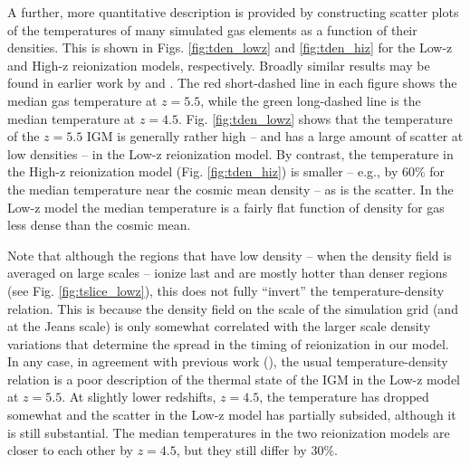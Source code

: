 A further, more quantitative description is provided by constructing 
scatter plots of the temperatures of many simulated gas elements
as a function of their densities. This is shown in Figs. \ref{fig:tden_lowz} and \ref{fig:tden_hiz} for the Low-z and
High-z reionization models, respectively. Broadly similar results may be found in earlier work by \citet{Trac:2008yz} and \citet{Furlanetto:2009kr}. The red short-dashed line in each figure shows the median gas temperature at $z=5.5$, while
the green long-dashed line is the median temperature at $z=4.5$. Fig. \ref{fig:tden_lowz}
shows that the temperature of the $z=5.5$ IGM is generally rather high -- and has a large amount of scatter at low
densities -- in the Low-z reionization model. By contrast, the temperature
in the High-z reionization model (Fig. \ref{fig:tden_hiz}) is smaller -- e.g., by 60\% for the median temperature near
the cosmic mean density  -- as is the scatter. In the Low-z model the median temperature is a fairly flat function of density
for gas less dense than the cosmic mean. 

Note that although the regions that have low density -- when the density field is averaged on large scales -- ionize last and are mostly
hotter than denser regions (see Fig. \ref{fig:tslice_lowz}), this does not fully ``invert'' the temperature-density relation. This is because the density field on the scale of the simulation grid (and at the Jeans scale) is
only somewhat correlated with the larger scale density variations that determine the spread in the timing of reionization
in our model. In any case, in agreement with previous work (\citealt{Trac:2008yz,Furlanetto:2009kr}), the usual temperature-density
relation is a poor description of the thermal state of the IGM in the Low-z model at $z=5.5$. 
At slightly lower redshifts, $z=4.5$, the temperature
has dropped somewhat and the scatter in the Low-z model has partially subsided, although it is still substantial. The median
temperatures in the two reionization models are closer to each other by $z=4.5$, but they still differ by 30\%. 

